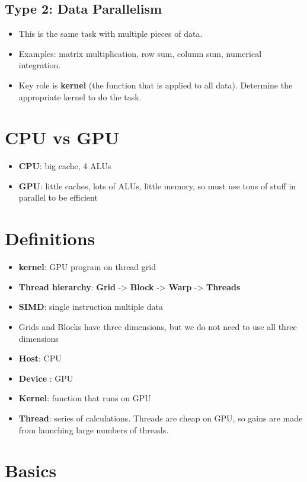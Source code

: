 \documentclass[11pt]{article}
\begin{document}
\subsection{Type 2: Data Parallelism}
\label{sec-2-2}

\begin{itemize}
\item This is the same task with multiple pieces of data.
\item Examples: matrix multiplication, row sum, column sum, numerical
  integration.
\item Key role is \textbf{kernel} (the function that is applied to all data).
  Determine the appropriate kernel to do the task.
\end{itemize}
\section{CPU vs GPU}
\label{sec-3}

\begin{itemize}
\item \textbf{CPU}: big cache, 4 ALUs
\item \textbf{GPU}: little caches, lots of ALUs, little memory, so must use tons
  of stuff in parallel to be efficient
\end{itemize}
\section{Definitions}
\label{sec-4}

\begin{itemize}
\item \textbf{kernel}: GPU program on thread grid
\item \textbf{Thread hierarchy}: \textbf{Grid} -> \textbf{Block} -> \textbf{Warp} -> \textbf{Threads}
\item \textbf{SIMD}: single instruction multiple data
\item Grids and Blocks have three dimensions, but we do not need to use
  all three dimensions
\item \textbf{Host}: CPU
\item \textbf{Device} : GPU
\item \textbf{Kernel}: function that runs on GPU
\item \textbf{Thread}: series of calculations.  Threads are cheap on GPU, so
  gains are made from launching large numbers of threads.
\end{itemize}
\section{Basics}
\label{sec-5}
\end{document}
